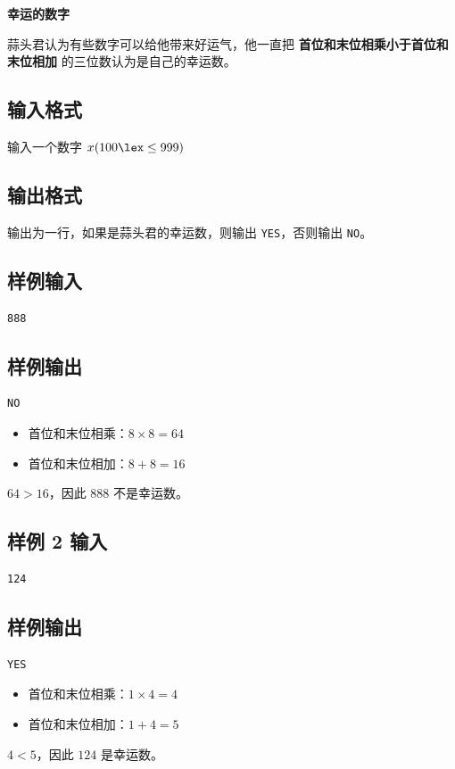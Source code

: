 \documentclass{article}
\newcommand{\problemname}[1]{\begin{center}\Large\bfseries #1\end{center}}
\begin{document}
\problemname{幸运的数字}

蒜头君认为有些数字可以给他带来好运气，他一直把 \textbf{首位和末位相乘小于首位和末位相加} 的三位数认为是自己的幸运数。

\subsection*{输入格式}
输入一个数字 $x(100\lex\le999)$

\subsection*{输出格式}
输出为一行，如果是蒜头君的幸运数，则输出 \texttt{YES}，否则输出 \texttt{NO}。

\subsection*{样例输入}
\begin{verbatim}
888
\end{verbatim}

\subsection*{样例输出}
\begin{verbatim}
NO
\end{verbatim}

\begin{itemize}
  \item 首位和末位相乘：$8\times8=64$

  \item 首位和末位相加：$8+8=16$

\end{itemize}
$64>16$，因此 $888$ 不是幸运数。

\subsection*{样例 2 输入}
\begin{verbatim}
124
\end{verbatim}

\subsection*{样例输出}
\begin{verbatim}
YES
\end{verbatim}

\begin{itemize}
  \item 首位和末位相乘：$1\times4=4$

  \item 首位和末位相加：$1+4=5$

\end{itemize}
$4<5$，因此 $124$ 是幸运数。
\end{document}
